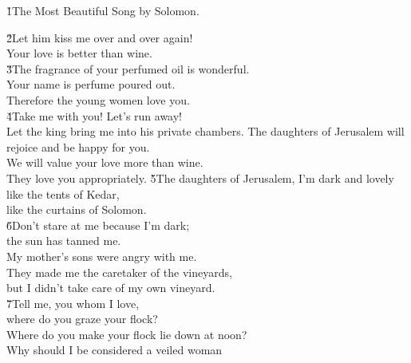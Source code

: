 


\v{1}The Most Beautiful Song by Solomon.

\begin{poetry}
\poeml \v{2}Let him kiss me over and over again! \\
\poemll    Your love is better than wine. \\
\poeml \v{3}The fragrance of your perfumed oil is wonderful. \\
\poemll    Your name is perfume poured out. \\
\poemlll       Therefore the young women love you. \\
\poeml \v{4}Take me with you! Let's run away! \\
\poemll    Let the king bring me into his private chambers.
\poeml The daughters of Jerusalem will rejoice and be happy for you. \\
\poemll    We will value your love more than wine. \\
\poemlll       They love you appropriately.
\poeml \v{5}The daughters of Jerusalem, I'm dark and lovely \\
\poemll    like the tents of Kedar, \\
\poemlll       like the curtains of Solomon. \\
\poeml \v{6}Don't stare at me because I'm dark; \\
\poemll    the sun has tanned me. \\
\poeml My mother's sons were angry with me. \\
\poemll    They made me the caretaker of the vineyards, \\
\poemlll       but I didn't take care of my own vineyard. \\
\poeml \v{7}Tell me, you whom I love, \\
\poemll    where do you graze your flock? \\
\poemlll       Where do you make your flock lie down at noon? \\
\poeml Why should I be considered a veiled woman \\

\end{poetry}
